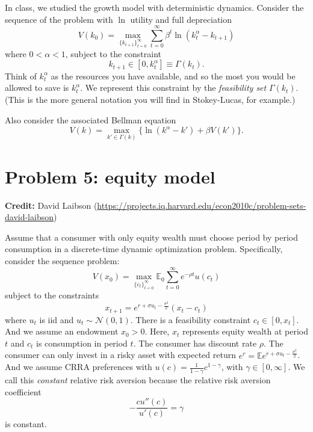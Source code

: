 \documentclass[11pt]{extarticle}
\theoremstyle{plain}
\theoremstyle{definition}
\begin{document}
\vspace{5mm}
\noindent
In class, we studied the growth model with deterministic dynamics. Consider the sequence of the problem with $\ln$ utility and full depreciation
\begin{equation*}
	V(k_0) = \max_{ \{ k_{t+1} \}_{t=0}^\infty} \sum_{t=0}^\infty \beta^t \ln (k_t^\alpha - k_{t+1})
\end{equation*}
where $0 < \alpha < 1$, subject to the constraint
\begin{equation*}
	k_{t+1} \in [0, k_t^\alpha] \equiv \Gamma(k_t).
\end{equation*}
Think of $k_t^\alpha$ as the resources you have available, and so the most you would be allowed to save is $k_t^\alpha$. We represent this constraint by the \textit{feasibility set} $\Gamma(k_t)$. (This is the more general notation you will find in Stokey-Lucas, for example.)

Also consider the associated Bellman equation 
\begin{equation*}
	V(k) = \max_{k' \in \Gamma(k)} \bigg\{ \ln (k^\alpha - k') + \beta V(k') \bigg\}.
\end{equation*}


\vspace{10mm}
\section*{Problem 5: equity model}

\textbf{Credit:} David Laibson (\url{https://projects.iq.harvard.edu/econ2010c/problem-sets-david-laibson})

\vspace{5mm}
\noindent
Assume that a consumer with only equity wealth must choose period by period consumption in a discrete-time dynamic optimization problem. Specifically, consider the sequence problem:
\begin{equation*}
	V(x_0) = \max_{ \{ c_t \}_{t=0}^\infty } \mathbb E_0 \sum_{t=0}^\infty e^{- \rho t} u(c_t)
\end{equation*}
subject to the constraints
\begin{equation*}
	x_{t+1} = e^{r + \sigma u_t - \frac{\sigma^2}{2}} (x_t - c_t)
\end{equation*}
where $u_t$ is iid and $u_t \sim \mathcal N(0, 1)$. There is a feasibility constraint $c_t \in [0, x_t]$. And we assume an endowment $x_0 > 0$. Here, $x_t$ represents equity wealth at period $t$ and $c_t$ is consumption in period $t$. The consumer has discount rate $\rho$. The consumer can only invest in a risky asset with expected return $e^r = \mathbb E e^{r + \sigma u_t - \frac{\sigma^2}{2}}$. And we assume CRRA preferences with $u(c) = \frac{1}{1-\gamma} c^{1-\gamma}$, with $\gamma \in [0, \infty]$. We call this \textit{constant} relative risk aversion because the relative risk aversion coefficient
\begin{equation*}
	- \frac{c u''(c)}{u'(c)} = \gamma
\end{equation*}
is constant. 
\end{document}
